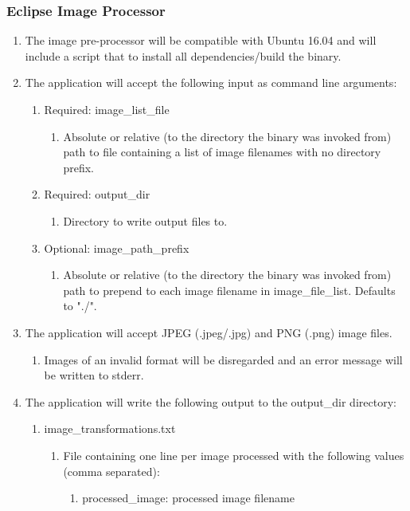 \documentclass[10pt, onecolumn, draftclsnofoot, letterpaper, compsoc]{IEEEtran}
\begin{document}
\subsubsection{Eclipse Image Processor}
	\begin{enumerate}
		\item The image pre-processor will be compatible with Ubuntu 16.04 and
		 will include a script that to install all dependencies/build the 
		 binary.

		 \item The application will accept the following input as command line
		 arguments:
		 \begin{enumerate}
		 	\item Required: image\_list\_file
		 		\begin{enumerate}
		 			\item Absolute or relative (to the directory the binary was 
		 			invoked from) path to file containing a list of image filenames 
		 			with no directory prefix.
		 		\end{enumerate}

		 	\item Required: output\_dir
		 		\begin{enumerate}
		 			\item Directory to write output files to.
		 		\end{enumerate}

		 	\item Optional: image\_path\_prefix
		 		\begin{enumerate}
		 			\item Absolute or relative (to the directory the binary was
		 			 invoked from) path to prepend to each image filename in 
		 			 image\_file\_list. Defaults to "./".
		 		\end{enumerate}
		 \end{enumerate}

		 \item The application will accept JPEG (.jpeg/.jpg) and PNG (.png) 
		 image files.
		 \begin{enumerate}
		 	\item Images of an invalid format will be disregarded and an error
		 	 message will be written to stderr.
		 \end{enumerate}

		 \item The application will write the following output to the 
		 output\_dir directory:
		 \begin{enumerate}
		 	\item image\_transformations.txt
		 	\begin{enumerate}
		 		\item File containing one line per image processed with the 
		 		following values (comma separated):
		 		\begin{enumerate}
		 			\item processed\_image: processed image filename


\end{enumerate}
\end{enumerate}
\end{enumerate}
\end{enumerate}
\end{document}
